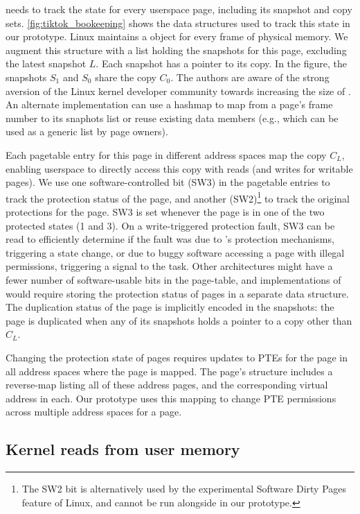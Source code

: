 \documentclass[letterpaper,twocolumn,10pt, anonymous]{article}
\begin{document}
\tiktok needs to track the state for every userspace page, including
its snapshot and copy sets.
\autoref{fig:tiktok_bookeeping} shows the data structures used to
track this state in our prototype.
Linux maintains a  object for every frame of 
physical memory. 
We augment this structure with a list holding the snapshots
for this page, excluding the latest snapshot $L$.
Each snapshot has a pointer to its copy. 
In the figure, the snapshots $S_1$ and $S_0$ share the copy $C_0$.
The authors are aware of the strong aversion of the 
Linux kernel developer community towards increasing the size of 
. 
An alternate implementation can use a hashmap to
map from a page's frame number to its snaphots list or
reuse existing data members (e.g.,  which 
can be used as a generic list by page owners).

Each pagetable entry for this page in different address spaces 
map the copy $C_L$, enabling userspace to directly access this
copy with reads (and writes for writable pages).
We use one software-controlled bit (SW3) in the pagetable entries 
to track the protection status of the page, and another 
(SW2)\footnote{The SW2 bit is alternatively used by the experimental Software Dirty Pages feature of 
Linux, and cannot be run alongside \tiktok in our prototype.}
to track the original protections for the page. 
SW3 is set whenever the page is in one of the two protected
states (1 and 3).
On a write-triggered protection fault, SW3 can be read to 
efficiently determine if the fault was due to \tiktok's protection 
mechanisms, triggering a state change, or due to buggy software
accessing a page with illegal permissions, triggering a signal to 
the task.
Other architectures might have a fewer number of software-usable 
bits in the page-table, and implementations of \tiktok would 
require storing the protection status of pages in a separate data structure.
The duplication status of the page is implicitly encoded in the 
snapshots: the page is duplicated when any of its snapshots
holds a pointer to a copy other than $C_L$.

Changing the protection state of pages requires updates to 
PTEs for the page in all address spaces where the page is mapped.
The page's  structure includes a reverse-map
listing all of these address pages, and the corresponding virtual
address in each.
Our prototype uses this mapping to change PTE permissions across
multiple address spaces for a page.


\subsection{Kernel reads from user memory}
\end{document}
